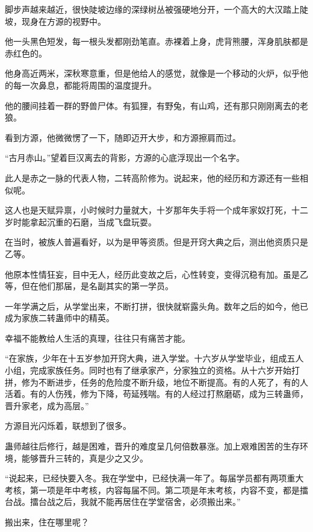 
\begin{this_body}



脚步声越来越近，很快陡坡边缘的深绿树丛被强硬地分开，一个高大的大汉踏上陡坡，现身在方源的视野中。

他一头黑色短发，每一根头发都刚劲笔直。赤裸着上身，虎背熊腰，浑身肌肤都是赤红色的。

他身高近两米，深秋寒意重，但是他给人的感觉，就像是一个移动的火炉，似乎他的每一次鼻息，都能将周围的温度提升。

他的腰间挂着一群的野兽尸体。有狐狸，有野兔，有山鸡，还有那只刚刚离去的老狼。

看到方源，他微微愣了一下，随即迈开大步，和方源擦肩而过。

“古月赤山。”望着巨汉离去的背影，方源的心底浮现出一个名字。

此人是赤之一脉的代表人物，二转高阶修为。说起来，他的经历和方源还有一些相似呢。

这人也是天赋异禀，小时候时力量就大，十岁那年失手将一个成年家奴打死，十二岁时能拿起沉重的石磨，当成飞盘玩耍。

在当时，被族人普遍看好，以为是甲等资质。但是开窍大典之后，测出他资质只是乙等。

他原本性情狂妄，目中无人，经历此变故之后，心性转变，变得沉稳有加。虽是乙等，但在他们那届，是名副其实的第一学员。

一年学满之后，从学堂出来，不断打拼，很快就崭露头角。数年之后的如今，他已成为家族二转蛊师中的精英。

幸福不能教给人生活的真理，往往只有痛苦才能。

“在家族，少年在十五岁参加开窍大典，进入学堂。十六岁从学堂毕业，组成五人小组，完成家族任务。同时也有了继承家产，分家独立的资格。从十六岁开始打拼，修为不断进步，任务的危险度不断升级，地位不断提高。有的人死了，有的人活着。有的人伤残，修为下降，苟延残喘。有的人经过打熬磨砺，成为三转蛊师，晋升家老，成为高层。”

方源目光闪烁着，联想到了很多。

蛊师越往后修行，越是困难，晋升的难度呈几何倍数暴涨。加上艰难困苦的生存环境，能够晋升三转的，真是少之又少。

“说起来，已经快要入冬。我在学堂中，已经快满一年了。每届学员都有两项重大考核，第一项是年中考核，内容每届不同。第二项是年末考核，内容不变，都是擂台战。擂台战之后，我就不能再居住在学堂宿舍，必须搬出来。”

搬出来，住在哪里呢？


\end{this_body}
